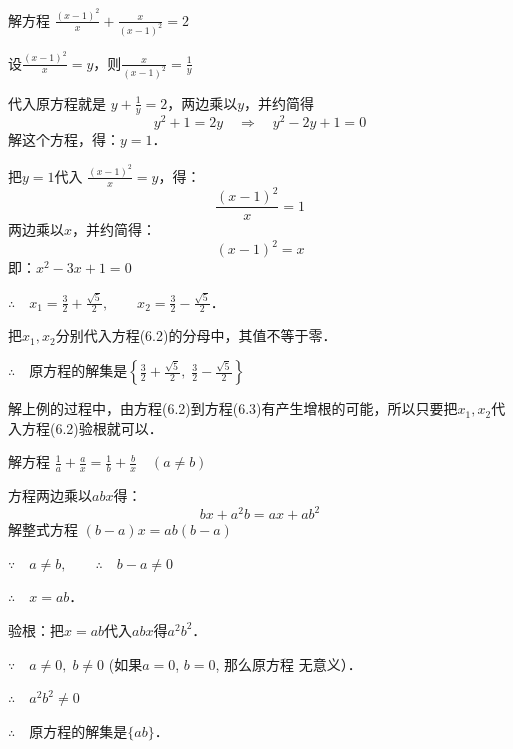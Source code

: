 \begin{example}
解方程 $\frac{(x-1)^2}{x}+\frac{x}{(x-1)^2}=2$
\end{example}

\begin{solution}
设$\frac{(x-1)^2}{x}=y$，则$\frac{x}{(x-1)^2}=\frac{1}{y}$

代入原方程就是 $y+\frac{1}{y}=2$，两边乘以$y$，并约简得
\[y^2+1=2y\quad \Rightarrow\quad y^2-2y+1=0\]
解这个方程，得：$y=1$．

把$y=1$代入 $\frac{(x-1)^2}{x}=y$，得：
\begin{equation}
    \frac{(x-1)^2}{x}=1
\end{equation}
两边乘以$x$，并约简得：
\begin{equation}
    (x-1)^2=x
\end{equation}
即：$x^2-3x+1=0$

$\therefore\quad x_1=\frac{3}{2}+\frac{\sqrt{5}}{2},\qquad x_2=\frac{3}{2}-\frac{\sqrt{5}}{2}$．

把$x_1,x_2$分别代入方程(6.2)的分母中，其值不等于零．

$\therefore\quad $原方程的解集是$\left\{\frac{3}{2}+\frac{\sqrt{5}}{2},\; \frac{3}{2}-\frac{\sqrt{5}}{2}\right\}$

\end{solution}

\begin{note}
   解上例的过程中，由方程(6.2)到方程(6.3)有产生增根的可能，所以只要把$x_1,x_2$代入方程(6.2)验根就可以．
\end{note}



\begin{example}
    解方程
$\frac{1}{a}+\frac{a}{x}=\frac{1}{b}+\frac{b}{x}\quad (a\ne b)$
\end{example}

\begin{solution}
    方程两边乘以$abx$得：
\[bx+a^2b=ax+ab^2\]
解整式方程 $(b-a)x=ab(b-a)$

$\because\quad a\ne b,\qquad \therefore\quad b-a\ne 0$

$\therefore\quad x=ab$．

验根：把$x=ab$代入$abx$得$a^2b^2$．

$\because\quad a\ne 0,\; b\ne 0$ (如果$a=0$, $b=0$, 那么原方程
无意义）．

$\therefore\quad a^2b^2\ne 0$

$\therefore\quad $原方程的解集是$\{ab\}$．
\end{solution}

